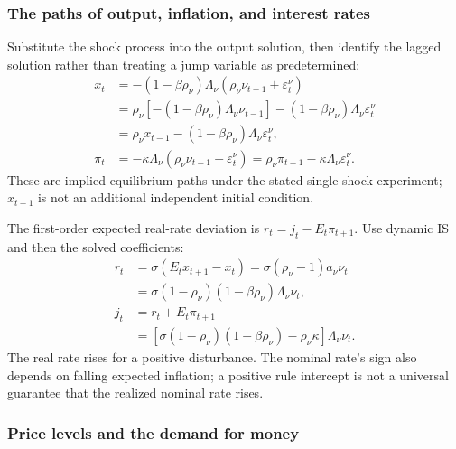 \subsubsection{The paths of output, inflation, and interest rates}

Substitute the shock process into the output solution, then identify the lagged
solution rather than treating a jump variable as predetermined:
\begin{align}
 x_t&=-(1-\beta\rho_\nu)\Lambda_\nu
                       (\rho_\nu\nu_{t-1}+\varepsilon_t^\nu)\\
 &=\rho_\nu[-(1-\beta\rho_\nu)\Lambda_\nu\nu_{t-1}]
                      -(1-\beta\rho_\nu)\Lambda_\nu\varepsilon_t^\nu\\
 &=\rho_\nu x_{t-1}-(1-\beta\rho_\nu)\Lambda_\nu\varepsilon_t^\nu,\\
 \pi_t&=-\kappa\Lambda_\nu(\rho_\nu\nu_{t-1}+\varepsilon_t^\nu)
       =\rho_\nu\pi_{t-1}-\kappa\Lambda_\nu\varepsilon_t^\nu.
\end{align}
These are implied equilibrium paths under the stated single-shock experiment;
$x_{t-1}$ is not an additional independent initial condition.

The first-order expected real-rate deviation is $r_t=j_t-E_t\pi_{t+1}$.
Use dynamic IS and then the solved coefficients:
\begin{align}
 r_t&=\sigma(E_tx_{t+1}-x_t)
     =\sigma(\rho_\nu-1)a_\nu\nu_t\\
 &=\sigma(1-\rho_\nu)(1-\beta\rho_\nu)\Lambda_\nu\nu_t,\\
 j_t&=r_t+E_t\pi_{t+1}\\
 &=[\sigma(1-\rho_\nu)(1-\beta\rho_\nu)-\rho_\nu\kappa]
                                               \Lambda_\nu\nu_t.
 \label{eq:nk-rate-response}
\end{align}
The real rate rises for a positive disturbance. The nominal rate's sign also
depends on falling expected inflation; a positive rule intercept is not a
universal guarantee that the realized nominal rate rises.

\subsubsection{Price levels and the demand for money}

